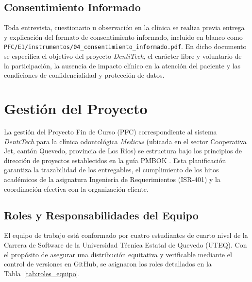 \documentclass[12pt,a4paper]{article}
\begin{document}
\subsection{Consentimiento Informado}

Toda entrevista, cuestionario u observaci{\'o}n en la cl{\'i}nica se realiza previa entrega y explicaci{\'o}n del formato de consentimiento informado, incluido en blanco como \texttt{PFC/E1/instrumentos/04\_consentimiento\_informado.pdf}. En dicho documento se especifica el objetivo del proyecto \textit{DentiTech}, el car{\'a}cter libre y voluntario de la participaci{\'o}n, la ausencia de impacto cl{\'i}nico en la atenci{\'o}n del paciente y las condiciones de confidencialidad y protecci{\'o}n de datos.





\section{Gesti{\'o}n del Proyecto}

La gesti{\'o}n del Proyecto Fin de Curso (PFC) correspondiente al sistema \textit{DentiTech} para la cl{\'i}nica odontol{\'o}gica \textit{Medicus} (ubicada en el sector Cooperativa Jet, cant{\'o}n Quevedo, provincia de Los R{\'i}os) se estructura bajo los principios de direcci{\'o}n de proyectos establecidos en la gu{\'i}a PMBOK \cite{pmbok2021}. Esta planificaci{\'o}n garantiza la trazabilidad de los entregables, el cumplimiento de los hitos acad{\'e}micos de la asignatura Ingenier{\'i}a de Requerimientos (ISR-401) y la coordinaci{\'o}n efectiva con la organizaci{\'o}n cliente.

\subsection{Roles y Responsabilidades del Equipo}

El equipo de trabajo est{\'a} conformado por cuatro estudiantes de cuarto nivel de la Carrera de Software de la Universidad T{\'e}cnica Estatal de Quevedo (UTEQ). Con el prop{\'o}sito de asegurar una distribuci{\'o}n equitativa y verificable mediante el control de versiones en GitHub, se asignaron los roles detallados en la Tabla~\ref{tab:roles_equipo}.
\end{document}
